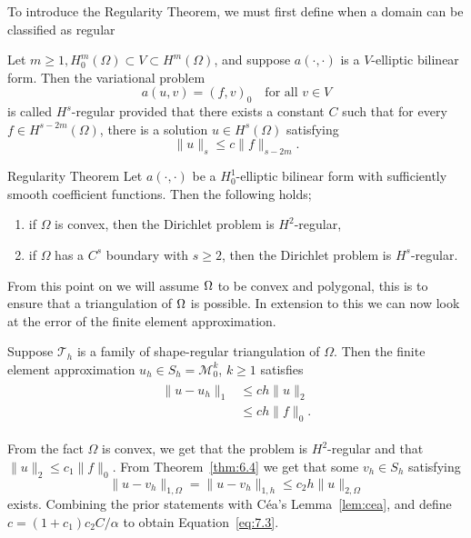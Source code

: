 To introduce the Regularity Theorem, we must first define when a domain can be classified as regular

\begin{defn}{\quad\label{defn:7.1}}
    Let $m\geq 1, H^m_0(\Omega)\subset V\subset H^m(\Omega)$, and suppose $a(\cdot,\cdot)$ is a $V$-elliptic bilinear form. 
    Then the variational problem
    \begin{equation}
        a(u,v) = {(f,v)}_0\quad \text{for all } v\in V
    \end{equation}
    is called $H^s$-regular provided that there exists a constant $C$ such that for every  $f\in H^{s-2m}(\Omega)$,
    there is a solution $u\in H^s(\Omega)$ satisfying
    \begin{equation}
        \|u\|_s\leq c\|f\|_{s-2m}.
    \end{equation}
\end{defn}

\begin{thmx}{Regularity Theorem}
    Let $a(\cdot,\cdot)$ be a $H^1_0$-elliptic bilinear form with sufficiently smooth coefficient functions. Then the following holds; 
    \begin{enumerate}
        \item if $\Omega$ is convex, then the Dirichlet problem is $H^2$-regular, 
        \item if $\Omega$ has a $C^s$ boundary with $s\geq 2$, then the Dirichlet problem is $H^s$-regular.
    \end{enumerate}
\end{thmx}


From this point on we will assume $\Omega$ to be convex and polygonal, this is to ensure that a triangulation of $\Omega$ is possible. In extension to this we can now look at the error of the finite element approximation.

\begin{thmx}{\quad}
    Suppose $\mathcal{T}_h$ is a family of shape-regular triangulation of $\Omega$. 
    Then the finite element approximation $u_h\in S_h = \mathcal{M}^k_0$, $k\geq 1$ satisfies
    \begin{align}
        \begin{split}
            \|u-u_h\|_1&\leq ch\|u\|_2\ \\
            &\leq ch\|f\|_0.
        \end{split}
        \label{eq:7.3}
    \end{align}\label{thm:7.3}
\end{thmx}
\begin{bev}
    From the fact $\Omega$ is convex, we get that the problem is $H^2$-regular and that $\|u\|_2 \leq c_1\|f\|_0$.
    From Theorem~\ref{thm:6.4} we get that some $v_h\in S_h$ satisfying 
    \begin{equation}
    \|u-v_h\|_{1,\Omega} = \|u-v_h\|_{1,h} \leq c_2h\|u\|_{2,\Omega}
    \end{equation}
    exists. 
    Combining the prior statements with Céa's Lemma~\ref{lem:cea}, and 
    define $c = (1+c_1)c_2C/\alpha$ 
    to obtain Equation~\ref{eq:7.3}.
\end{bev}